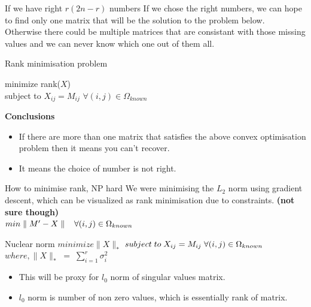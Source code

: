 \documentclass{beamer}
\begin{document}
\begin{frame}{If we have right $r(2n-r)$ numbers}
	If we chose the right numbers, we can hope to find only one matrix that will be the solution to the problem below. \\ Otherwise there could be multiple matrices that are consistant with those missing values and we can never know which one out of them all.
	\vspace{3mm}
	\begin{block}{Rank minimisation problem}
		\begin{center}
		minimize rank($X$) \\
		subject to $X_{ij} = M_{ij}$ \hspace{1mm}  $\forall (i,j) \in \Omega_{known}$
		\end{center}
	\end{block}

	\vspace{4mm}
	\textbf{Conclusions}
		\begin{itemize}
			\item If there are more than one matrix that satisfies the above convex optimisation problem then it means you can't recover.
			\item It means the choice of number is not right.
		\end{itemize}
	

\end{frame}


\begin{frame}{How to minimise rank, NP hard}
	\vspace {-3mm}
	We were minimising the $L_2$ norm using gradient descent, which can be visualized as rank minimisation due to constraints. \textbf{(not sure though)} \\
	\center	$min 	\parallel M'-X \parallel \hspace{3mm} \forall (i,j) \in \Omega_{known}$
	\vspace{4mm}
	\begin{block}{Nuclear norm}
		\center $ minimize \parallel X \parallel _*$
		\vspace {-3mm}
		\center $ subject \;  to \;  X_{ij} = M_{ij} \hspace{1mm}  \forall (i,j) \in \Omega_{known}$
		\vspace{-2mm}
		\center $where, \parallel X \parallel _* \; = \; \displaystyle\sum_{i=1}^{r} \sigma_i^2$
		
		\begin{itemize}
			\item This will be proxy for $l_0$ norm of singular values matrix.
			\item $l_0$ norm is number of non zero values, which is essentially rank of matrix.
		\end{itemize}
			 
		
	\end{block}
\end{frame}
\end{document}
